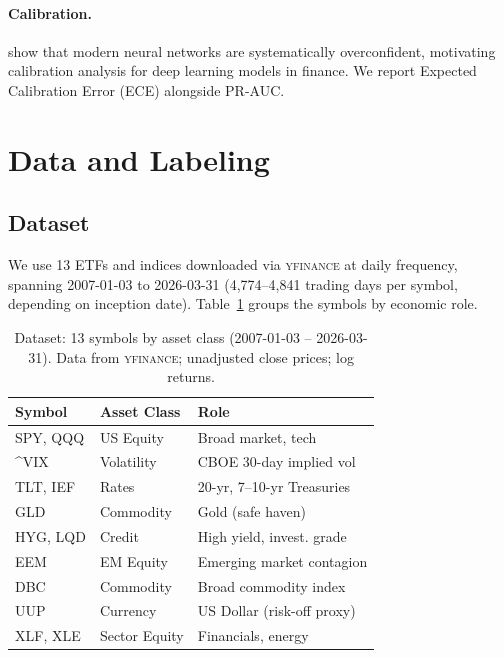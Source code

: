 \documentclass[sigconf]{acmart}
\begin{document}
\paragraph{Calibration.}
\citet{guo2017calibration} show that modern neural networks are systematically
overconfident, motivating calibration analysis for deep learning models in
finance. We report Expected Calibration Error (ECE) alongside PR-AUC.

\section{Data and Labeling}
\label{sec:data}

\subsection{Dataset}

We use 13 ETFs and indices downloaded via \textsc{yfinance} at daily
frequency, spanning 2007-01-03 to 2026-03-31 (4,774--4,841 trading days
per symbol, depending on inception date). Table~\ref{tab:symbols} groups the
symbols by economic role.

\begin{table}[t]
\caption{Dataset: 13 symbols by asset class (2007-01-03 -- 2026-03-31).
Data from \textsc{yfinance}; unadjusted close prices; log returns.}
\label{tab:symbols}
\small
\begin{tabular}{@{}llp{3.5cm}@{}}
\toprule
Symbol & Asset Class & Role \\
\midrule
SPY, QQQ        & US Equity      & Broad market, tech \\
\^{}VIX         & Volatility     & CBOE 30-day implied vol \\
TLT, IEF        & Rates          & 20-yr, 7--10-yr Treasuries \\
GLD             & Commodity      & Gold (safe haven) \\
HYG, LQD        & Credit         & High yield, invest. grade \\
EEM             & EM Equity      & Emerging market contagion \\
DBC             & Commodity      & Broad commodity index \\
UUP             & Currency       & US Dollar (risk-off proxy) \\
XLF, XLE        & Sector Equity  & Financials, energy \\
\bottomrule
\end{tabular}
\vspace{-1mm}
\end{table}
\end{document}
